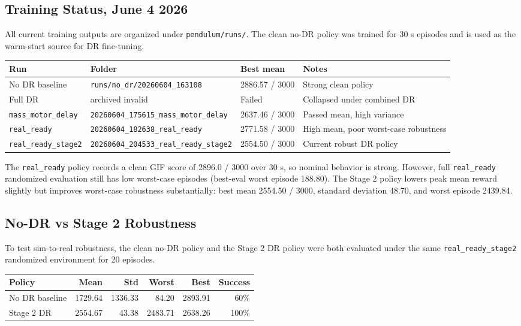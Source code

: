 \documentclass[12pt,a4paper]{article}
\begin{document}
\subsection{Training Status, June 4 2026}

All current training outputs are organized under \texttt{pendulum/runs/}.
The clean no-DR policy was trained for 30 s episodes and is used as the
warm-start source for DR fine-tuning.

\begin{center}
\begin{tabular}{llll}
\toprule
\textbf{Run} & \textbf{Folder} & \textbf{Best mean} & \textbf{Notes} \\
\midrule
No DR baseline & \texttt{runs/no\_dr/20260604\_163108} & 2886.57 / 3000 & Strong clean policy \\
Full DR & archived invalid & Failed & Collapsed under combined DR \\
\texttt{mass\_motor\_delay} & \texttt{20260604\_175615\_mass\_motor\_delay} & 2637.46 / 3000 & Passed mean, high variance \\
\texttt{real\_ready} & \texttt{20260604\_182638\_real\_ready} & 2771.58 / 3000 & High mean, poor worst-case robustness \\
\texttt{real\_ready\_stage2} & \texttt{20260604\_204533\_real\_ready\_stage2} & 2554.50 / 3000 & Current robust DR policy \\
\bottomrule
\end{tabular}
\end{center}

\noindent The \texttt{real\_ready} policy records a clean GIF score of
2896.0 / 3000 over 30 s, so nominal behavior is strong.  However, full
\texttt{real\_ready} randomized evaluation still has low worst-case episodes
(best-eval worst episode 188.80).  The Stage 2 policy lowers peak mean reward
slightly but improves worst-case robustness substantially: best mean
2554.50 / 3000, standard deviation 48.70, and worst episode 2439.84.

\subsection{No-DR vs Stage 2 Robustness}

To test sim-to-real robustness, the clean no-DR policy and the Stage 2 DR
policy were both evaluated under the same \texttt{real\_ready\_stage2}
randomized environment for 20 episodes.

\begin{center}
\begin{tabular}{lrrrrr}
\toprule
\textbf{Policy} & \textbf{Mean} & \textbf{Std} & \textbf{Worst} & \textbf{Best} & \textbf{Success} \\
\midrule
No DR baseline & 1729.64 & 1336.33 & 84.20 & 2893.91 & 60\% \\
Stage 2 DR & 2554.67 & 43.38 & 2483.71 & 2638.26 & 100\% \\
\bottomrule
\end{tabular}
\end{center}
\end{document}
